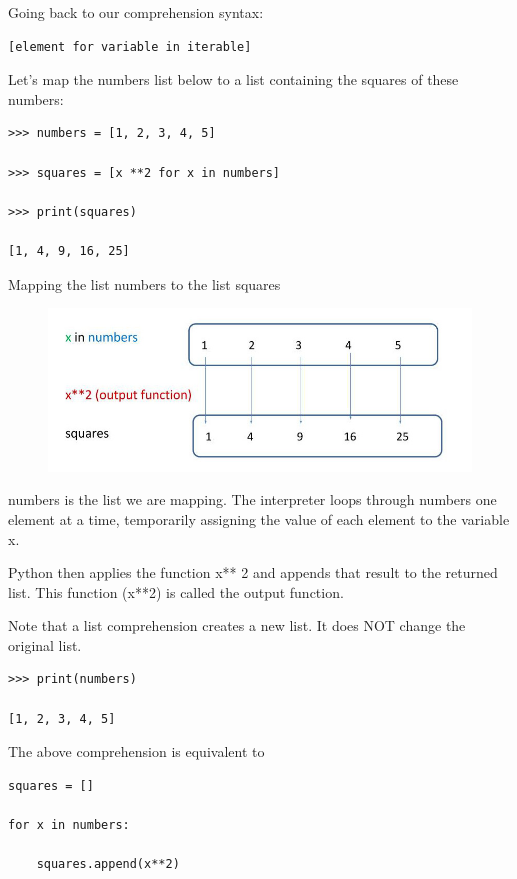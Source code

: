 \documentclass{article}
\begin{document}
Going back to our comprehension syntax:

\begin{lstlisting}
[element for variable in iterable]
\end{lstlisting}

Let's map the numbers list below to a list containing the squares of these numbers:

\begin{lstlisting}
>>> numbers = [1, 2, 3, 4, 5]

>>> squares = [x **2 for x in numbers]

>>> print(squares)

[1, 4, 9, 16, 25]
\end{lstlisting}
 
Mapping the list numbers to the list squares

\begin{figure}[h]
\includegraphics[scale=.6]{mapping}\\
\end{figure}

numbers is the list we are mapping. The interpreter loops through numbers one element at a time, temporarily assigning the value of each element to the variable x. 

Python then applies the function x** 2 and appends that result to the returned list. This function (x**2) is called the output function.

Note that a list comprehension creates a new list.  It does NOT change the original list.

\begin{lstlisting}
>>> print(numbers)

[1, 2, 3, 4, 5]
\end{lstlisting}

The above comprehension is equivalent to

\begin{lstlisting}
squares = []

for x in numbers:

    squares.append(x**2)
\end{lstlisting}
\end{document}
